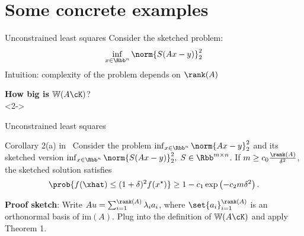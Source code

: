 \documentclass[10pt]{beamer}
\newcommand{\xstar}{x^{\star}}
\begin{document}
\section{Some concrete examples}

\begin{frame}{Unconstrained least squares}
    Consider the sketched problem:
    \begin{align*}
        \inf_{x \in \Rbb^n} \norm{S(Ax - y)}_2^2
    \end{align*}
    Intuition: complexity of the problem depends on $\rank(A)$ \linebreak

    \begin{center}
        {\color{cred} \textbf{How big is} $\mathbb{W}(A \cK)$?} \\
        <2->
    \end{center}
\end{frame}

\begin{frame}{Unconstrained least squares}
    \begin{block}{Corollary 2(a) in~\cite{PilWain15}}
        Consider the problem $\inf_{x \in \Rbb^n} \norm{Ax - y}_2^2$ and its
        sketched version $\inf_{x \in \Rbb^n} \norm{S(Ax - y)}_2^2, \;
        S \in \Rbb^{m \times n}$. If $m \geq c_0 \frac{\rank(A)}{\delta^2}$, the
        sketched solution satisfies
        \[
            \prob{f(\xhat) \leq (1 + \delta)^2 f(\xstar)}
            \geq 1 - c_1 \exp\left(-c_2 m \delta^2\right).
        \]
    \end{block}
    \vspace{1em}

    \textbf{Proof sketch}:
        Write $Au = \sum_{i=1}^{\rank(A)} \lambda_i a_i$, where
        $\set{a_i}_{i=1}^{\rank(A)}$ is an orthonormal basis of
        $\mathrm{im}(A)$. Plug into the definition of $\mathbb{W}(A \cK)$
        and apply Theorem 1.
\end{frame}
\end{document}
